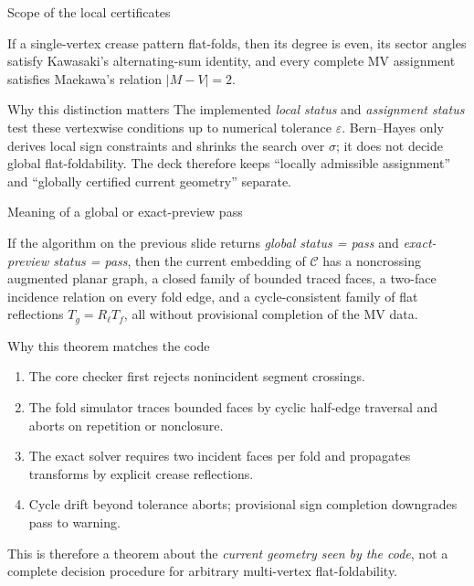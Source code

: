 \documentclass[aspectratio=169,10pt]{beamer}
\newcommand{\CP}{\mathcal{C}}
\newcommand{\eps}{\varepsilon}
\begin{document}
\begin{frame}{Scope of the local certificates}
\begin{theorem}
If a single-vertex crease pattern flat-folds, then its degree is even, its sector angles satisfy Kawasaki's alternating-sum identity, and every complete MV assignment satisfies Maekawa's relation \(|M-V|=2\). \textcolor{cpmid}{\cite{hull_math_flat}}
\end{theorem}

\begin{block}{Why this distinction matters}
\footnotesize The implemented \emph{local status} and \emph{assignment status}
test these vertexwise conditions up to numerical tolerance \(\eps\).
Bern--Hayes only derives local sign constraints and shrinks the search over
\(\sigma\); it does not decide global flat-foldability. The deck therefore
keeps ``locally admissible assignment'' and ``globally certified current
geometry'' separate. \textcolor{cpmid}{\cite{bern_hayes}}
\end{block}
\end{frame}

\begin{frame}{Meaning of a global or exact-preview pass}
\begin{theorem}
If the algorithm on the previous slide returns \emph{global status = pass} and \emph{exact-preview status = pass}, then the current embedding of \(\CP\) has a noncrossing augmented planar graph, a closed family of bounded traced faces, a two-face incidence relation on every fold edge, and a cycle-consistent family of flat reflections \(T_g=R_{\ell}T_f\), all without provisional completion of the MV data.
\end{theorem}

\begin{block}{Why this theorem matches the code}
\footnotesize
\begin{enumerate}\itemsep2pt
  \item The core checker first rejects nonincident segment crossings.
  \item The fold simulator traces bounded faces by cyclic half-edge traversal and aborts on repetition or nonclosure.
  \item The exact solver requires two incident faces per fold and propagates transforms by explicit crease reflections.
  \item Cycle drift beyond tolerance aborts; provisional sign completion downgrades pass to warning.
\end{enumerate}
\end{block}

\footnotesize This is therefore a theorem about the \emph{current geometry
seen by the code}, not a complete decision procedure for arbitrary multi-vertex
flat-foldability. \textcolor{cpmid}{\cite{hull_zakharevich,eppstein_flat}}
\end{frame}
\end{document}
